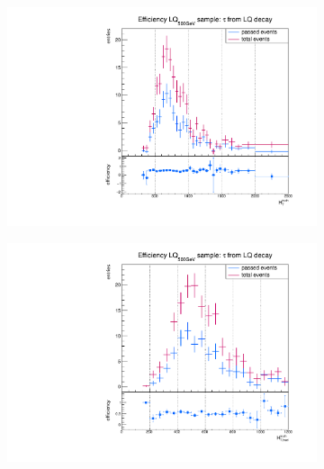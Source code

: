 \begin{figure}
  \centering
                \begin{subfigure}[t]{0.49\textwidth}
                \includegraphics[width=\textwidth]{figures/plots/LQ75/Divided_fromLQHT.pdf}
                \label{Dividedprompt:signal:HTLQ75}
                \end{subfigure}
                \begin{subfigure}[t]{0.49\textwidth}
                \includegraphics[width=\textwidth]{figures/plots/LQ75/Divided_fromLQHThad.pdf}

\end{subfigure}
\end{figure}
